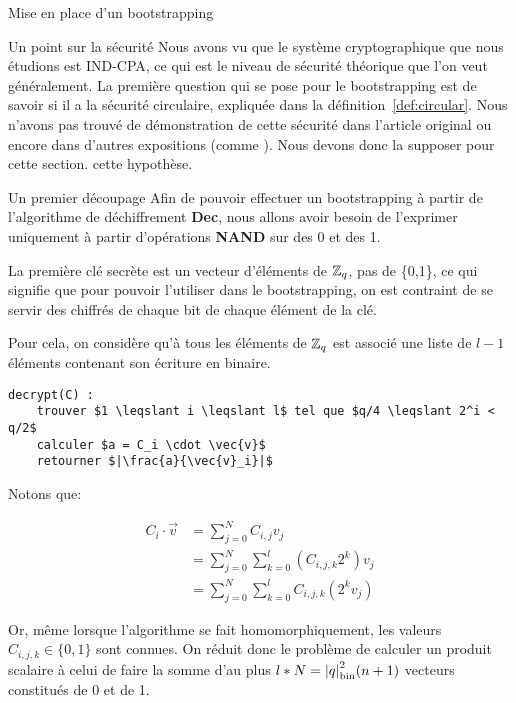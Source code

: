 \begin{section}{Mise en place d'un bootstrapping}
\begin{subsection}{Un point sur la sécurité}
	Nous avons vu que le système cryptographique que nous étudions est IND-CPA, ce qui est le niveau de sécurité
	théorique que l'on veut généralement. La première question qui se pose pour le bootstrapping est de savoir si
	il a la sécurité circulaire, expliquée dans la définition~\ref{def:circular}.
	Nous n'avons pas trouvé de démonstration de cette sécurité dans l'article original \cite{EPRINT:GenSahWat13} 
	ou encore dans d'autres expositions (comme \cite{halevi}). Nous devons donc la supposer pour cette section.
	cette hypothèse.
\end{subsection}
\begin{subsection}{Un premier découpage}
	Afin de pouvoir effectuer un bootstrapping à partir de l'algorithme de déchiffrement \textbf{Dec}, nous allons avoir besoin de l'exprimer uniquement à partir d'opérations \textbf{NAND} sur des 0 et des 1.
	
	La première clé secrète est un vecteur d'éléments de $\mathbb{Z}_q$, pas de \{0,1\}, ce qui signifie que pour pouvoir l'utiliser dans le bootstrapping, on est contraint de se servir des chiffrés de chaque bit de chaque élément de la clé.

	Pour cela, on considère qu'à tous les éléments de $\mathbb{Z}_q$ est associé une liste de $l-1$ éléments contenant son écriture en binaire.

\begin{lstlisting}
decrypt(C) :
	trouver $1 \leqslant i \leqslant l$ tel que $q/4 \leqslant 2^i < q/2$
	calculer $a = C_i \cdot \vec{v}$
	retourner $|\frac{a}{\vec{v}_i}|$
\end{lstlisting}

Notons que:

\begin{align*}
	C_i \cdot \vec{v} &= \sum_{j=0}^N C_{i,j} v_j \\
	&= \sum_{j=0}^N \sum_{k=0}^l \left( C_{i,j,k} 2^k \right) v_j \\
	&= \sum_{j=0}^N \sum_{k=0}^l C_{i,j,k} (2^k v_j)
\end{align*}

	Or, même lorsque l'algorithme se fait homomorphiquement, les valeurs
	$C_{i,j,k} \in \{ 0,1 \}$ sont connues. On réduit donc le problème de
	calculer un produit scalaire à celui de faire la somme d'au plus $l * N
	= {|q|}_{\text{bin}}^2 (n+1)$ vecteurs constitués de 0 et de 1.


\end{subsection}
\end{section}
